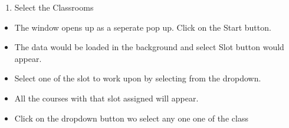 \documentclass[letterpaper,10pt,english]{sphinxmanual}
\begin{document}
\begin{sphinxVerbatim}[commandchars=\\\{\}]
 
\end{sphinxVerbatim}
\begin{enumerate}
%
\setcounter{enumi}{1}
\item {} 
Select the Classrooms

\end{enumerate}
\begin{itemize}
\item {} 
The window opens up as a seperate pop up. Click on the Start button.

\end{itemize}

\begin{itemize}
\item {} 
The data would be loaded in the background and select Slot button would appear.

\end{itemize}

\begin{itemize}
\item {} 
Select one of the slot to work upon by selecting from the dropdown.

\end{itemize}

\begin{itemize}
\item {} 
All the courses with that slot assigned will appear.

\end{itemize}

\begin{itemize}
\item {} 
Click on the dropdown button wo select any one one of the class

\end{itemize}
\end{document}
